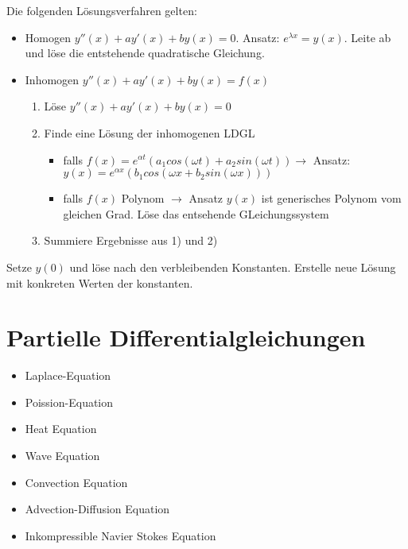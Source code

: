 \begin{definition}
	Die folgenden Lösungsverfahren gelten:
	
	\begin{itemize}
		\item Homogen $y''(x) + a y'(x) + b y(x) = 0$. Ansatz: $e^{\lambda x} = y(x)$. Leite ab und löse die entstehende quadratische Gleichung.
		\item Inhomogen $y''(x) + a y'(x) + b y(x) = f(x) $
		\begin{enumerate} [noitemsep]
			\item Löse $y''(x) + a y'(x) + b y(x) = 0$
			\item Finde eine Lösung der inhomogenen LDGL 
			\begin{itemize}
				\item falls $f(x) = e^{\alpha t} (a_1 cos(\omega t) + a_2 sin(\omega t)) \rightarrow $ Ansatz: $y(x) = e^{\alpha x} (b_1 cos(\omega x + b_2 sin(\omega x)))$
				\item falls $f(x)$ Polynom $\rightarrow$ Ansatz $y(x)$ ist generisches Polynom vom gleichen Grad. Löse das entsehende GLeichungssystem
			\end{itemize}
			\item Summiere Ergebnisse aus 1) und 2)
		\end{enumerate}
	\end{itemize}
\end{definition}

\begin{definition}[Anfangswertproblem]
	Setze $y(0)$ und löse nach den verbleibenden Konstanten. Erstelle neue Lösung mit konkreten Werten der konstanten.
\end{definition}

\pagebreak

\section{Partielle Differentialgleichungen}

\begin{definition}
	\begin{itemize}
		\item Laplace-Equation
		\item Poission-Equation
		\item Heat Equation
		\item Wave Equation
		\item Convection Equation
		\item Advection-Diffusion Equation
		\item Inkompressible Navier Stokes Equation 
	\end{itemize}
\end{definition}

